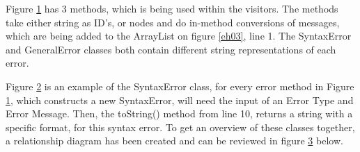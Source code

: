 \begin{figure}[H]
\centering
{}
\caption{}
\label{eh04}
\end{figure}
Figure \ref{eh04} has 3 methods, which is being used within the visitors. The methods take either string as ID’s, or nodes and do in-method conversions of messages, which are being added to the ArrayList on figure \ref{eh03}, line 1. The SyntaxError and GeneralError classes both contain different string representations of each error. 
\begin{figure}[H]
\centering
{}
\caption{}
\label{eh05}
\end{figure}
Figure \ref{eh05} is an example of the SyntaxError class, for every error method in Figure \ref{eh04}, which constructs a new SyntaxError, will need the input of an Error Type and Error Message. Then, the toString() method from line 10, returns a string with a specific format, for this syntax error. 
To get an overview of these classes together, a relationship diagram has been created and can be reviewed in figure \ref{eh06} below.
\begin{figure}[H]
\centering
{}
\caption{}
\label{eh06}
\end{figure}